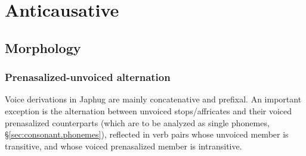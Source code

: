 \section{Anticausative} \label{sec:anticausative}

\subsection{Morphology} \label{sec:anticausative.morphology}  


\subsubsection{Prenasalized-unvoiced alternation} \label{sec:anticausative.pairs}  
Voice derivations in Japhug are mainly concatenative and prefixal. An important exception is the alternation between unvoiced stops/affricates and their voiced prenasalized counterparts (which are to be analyzed as single phonemes, §\ref{sec:consonant.phonemes}), reflected in verb pairs whose unvoiced member is transitive, and whose voiced prenasalized member is intransitive.
 


